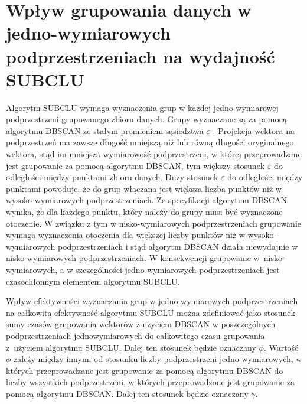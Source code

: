 \section{Wpływ grupowania danych w jedno-wymiarowych podprzestrzeniach na wydajność SUBCLU}
Algorytm SUBCLU \cite{subclu} wymaga wyznaczenia grup w każdej jedno-wymiarowej podprzestrzeni grupowanego zbioru danych. Grupy wyznaczane są za pomocą algorytmu DBSCAN \cite{dbscan} ze stałym promieniem sąsiedztwa $\varepsilon$ . Projekcja wektora na podprzestrzeń ma zawsze długość mniejszą niż lub równą długości oryginalnego wektora, stąd im mniejsza wymiarowość podprzestrzeni, w której przeprowadzane jest grupowanie za pomocą algorytmu DBSCAN, tym większy stosunek $\varepsilon$ do odległości między punktami zbioru danych. Duży stosunek $\varepsilon$ do odległości między punktami powoduje, że do grup włączana jest większa liczba punktów niż w wysoko-wymiarowych podprzestrzeniach. Ze specyfikacji algorytmu DBSCAN wynika, że dla każdego punktu, który należy do grupy musi być wyznaczone otoczenie. W związku z tym w nisko-wymiarowych podprzestrzeniach grupowanie wymaga wyznaczenia otoczenia dla większej liczby punktów niż w wysoko-wymiarowych podprzestrzeniach i stąd algorytm DBSCAN działa niewydajnie w nisko-wymiarowych podprzestrzeniach. W konsekwencji grupowanie \mbox{w nisko-wymiarowych}, a w szczególności jedno-wymiarowych podprzestrzeniach jest czasochłonnym elementem algorytmu SUBCLU.\par

Wpływ efektywności wyznaczania grup w jedno-wymiarowych podprzestrzeniach na całkowitą efektywność algorytmu SUBCLU można zdefiniować jako stosunek sumy czasów grupowania wektorów z użyciem DBSCAN w poszczególnych podprzestrzeniach jednowymiarowych do całkowitego czasu grupowania \mbox{z użyciem} algorytmu SUBCLU. Dalej ten stosunek będzie oznaczany $ \phi $. Wartość $ \phi $ zależy między innymi od stosunku liczby podprzestrzeni jedno-wymiarowych, w których przeprowadzane jest grupowanie za pomocą algorytmu DBSCAN do liczby wszystkich podprzestrzeni, w których przeprowadzone jest grupowanie za pomocą algorytmu DBSCAN. Dalej ten stosunek będzie oznaczany $ \gamma $.\par

